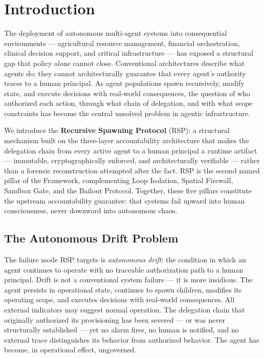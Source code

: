 \section{Introduction}
\label{sec:rs-intro}

The deployment of autonomous multi-agent systems into consequential environments — agricultural resource management, financial orchestration, clinical decision support, and critical infrastructure — has exposed a structural gap that policy alone cannot close. Conventional architectures describe what agents do; they cannot architecturally guarantee that every agent's authority traces to a human principal. As agent populations spawn recursively, modify state, and execute decisions with real-world consequences, the question of who authorized each action, through what chain of delegation, and with what scope constraints has become the central unsolved problem in agentic infrastructure.

We introduce the \textbf{Recursive Spawning Protocol} (RSP): a structural mechanism built on the \bxthree three-layer accountability architecture that makes the delegation chain from every active agent to a human principal a runtime artifact — immutable, cryptographically enforced, and architecturally verifiable — rather than a forensic reconstruction attempted after the fact. RSP is the second named pillar of the \bxthree Framework, complementing Loop Isolation, Spatial Firewall, Sandbox Gate, and the Bailout Protocol. Together, these five pillars constitute the upstream accountability guarantee: that \bxthree systems fail upward into human consciousness, never downward into autonomous chaos.

\subsection{The Autonomous Drift Problem}

The failure mode RSP targets is \emph{autonomous drift}: the condition in which an agent continues to operate with no traceable authorization path to a human principal. Drift is not a conventional system failure — it is more insidious. The agent persists in operational state, continues to spawn children, modifies its operating scope, and executes decisions with real-world consequences. All external indicators may suggest normal operation. The delegation chain that originally authorized its provisioning has been severed — or was never structurally established — yet no alarm fires, no human is notified, and no external trace distinguishes its behavior from authorized behavior. The agent has become, in operational effect, ungoverned.

